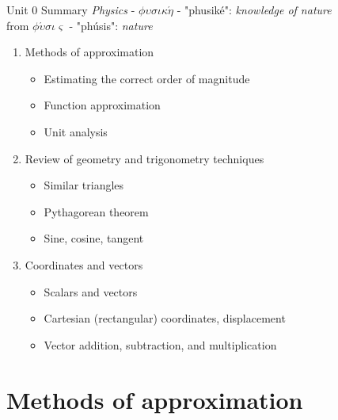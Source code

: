 \documentclass{beamer}
\begin{document}
\begin{frame}{Unit 0 Summary}
\textit{Physics} - $\phi\upsilon\sigma\iota\kappa\acute{\eta}$ - "phusik\'e": \textit{knowledge of nature} \\
from $\phi\acute{\upsilon}\sigma\iota\varsigma$ - "ph\'usis": \textit{nature}
\begin{enumerate}
\item Methods of approximation
\begin{itemize}
\item \alert{Estimating} the correct order of magnitude
\item \alert{Function} approximation
\item \alert{Unit analysis}
\end{itemize}
\item Review of geometry and trigonometry techniques
\begin{itemize}
\item Similar triangles
\item Pythagorean theorem
\item Sine, cosine, tangent
\end{itemize}
\item Coordinates and vectors
\begin{itemize}
\item \alert{Scalars} and \alert{vectors}
\item \alert{Cartesian} (rectangular) coordinates, displacement
\item \alert{Vector} addition, subtraction, and multiplication
\end{itemize}
\end{enumerate}
\end{frame}

\section{Methods of approximation}
\end{document}
